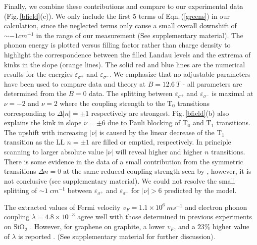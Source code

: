 \documentclass[prl,aps,superscriptaddress,showpacs,reprint]{revtex4-1}
\begin{document}
Finally, we combine these contributions and compare to our experimental data (Fig.\,\ref{bfield}(c)). We only include the first 5 terms of Eqn.\,(\ref{greens}) in our calculation, since the neglected terms only cause a small overall downshift of $\sim -1cm^{-1}$ in the range of our measurement (See supplementary material). The phonon energy is plotted versus filling factor rather than charge density to highlight the correspondence between the filled Landau levels and the extrema of kinks in the slope (orange lines). The solid red and blue lines are the numerical results for the energies $\varepsilon_{\sigma^+}$ and $\varepsilon_{\sigma^-}$. We emphasize that no adjustable parameters have been used to compare data and theory at $B=12.6\: T$ -  all parameters are determined from the $B=0$ data.
The splitting between $\varepsilon_{\sigma^+}$ and $\varepsilon_{\sigma^-}$ is maximal at $\nu=-2$ and $\nu=2$ where the coupling strength to the T$_0$ transitions corresponding to $\Delta|n|=\pm1$ respectively are strongest. Fig.\,\ref{bfield}(b) also explains the kink in slope $\nu=\pm6$ due to Pauli blocking of T$_0$ and T$_1$ transitions. The upshift with increasing $|\nu|$ is caused by the linear decrease of the T$_1$ transition as the LL $n=\pm1 $ are filled or emptied, respectively. In principle scanning to larger absolute value $|\nu|$ will reveal higher and higher $n$ transitions. 
There is some evidence in the data of a small contribution  from the symmetric transitions $\Delta n = 0$  \cite{PhysRevB.84.235138} at the same reduced coupling strength seen by \cite{faugeras2011magneto,kuhne2012polarization}, however, it is not conclusive (see supplementary material). We could not resolve the small splitting of $\sim 1\: cm^{-1}$ between $\varepsilon_{\sigma^+}$ and $\varepsilon_{\sigma^-}$ for $\left|\nu\right|>6$ predicted by the model.

The extracted values of Fermi velocity  $v_F=1.1\times 10^6\: ms^{-1}$ and electron phonon coupling $\lambda=4.8\times 10^{-3}$ agree well with those determined in previous experiments on SiO$_2$ \cite{PhysRevLett.110.227402,kossacki2012circular}. However, for graphene on graphite, a lower $v_F$,  and a $23\%$ higher value of  $\lambda$ is reported \cite{yan2010observation}. (See supplementary material for further discussion).
\end{document}
